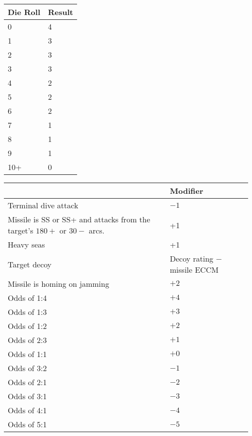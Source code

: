 \begin{twocolumntablefloat}

\begin{onecolumntable}
\begin{tabularx}{0.4\linewidth}{ll}
\toprule
Die Roll&Result\\
\midrule
0&4\\
1&3\\
2&3\\
3&3\\
4&2\\
5&2\\
6&2\\
7&1\\
8&1\\
9&1\\
10+&0\\
\bottomrule
\end{tabularx}

\end{onecolumntable}

\medskip

\begin{twocolumntable}
\begin{tabularx}{0.6\linewidth}{Ll}
\toprule
&Modifier\\
\midrule
Terminal dive attack&$-1$\\
Missile is SS or SS+ and attacks from the target's $180+$ or $30-$ arcs.&+1\\
Heavy seas&+1\\
Target decoy&Decoy rating $-$ missile ECCM\\
Missile is homing on jamming&$+2$\\
Odds of 1:4&$+4$\\
Odds of 1:3&$+3$\\
Odds of 1:2&$+2$\\
Odds of 2:3&$+1$\\
Odds of 1:1&$+0$\\
Odds of 3:2&$-1$\\
Odds of 2:1&$-2$\\
Odds of 3:1&$-3$\\
Odds of 4:1&$-4$\\
Odds of 5:1&$-5$\\
\bottomrule
\end{tabularx}
\end{twocolumntable}

\end{twocolumntablefloat}

